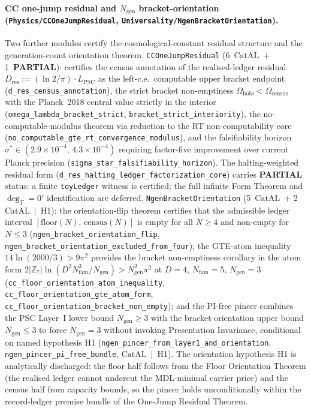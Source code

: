 \documentclass[11pt,a4paper]{article}
\theoremstyle{definition}
\newcommand{\CatAL}{\ensuremath{\mathrm{CatAL}}}
\begin{document}
\paragraph{CC one-jump residual and $N_{\mathrm{gen}}$ bracket-orientation
  (\texttt{Physics/\allowbreak CCOneJumpResidual},
   \texttt{Universality/\allowbreak NgenBracketOrientation}).}
Two further modules certify the cosmological-constant residual structure
and the generation-count orientation theorem.
\texttt{CCOneJumpResidual} (6~\CatAL\ + 1~\textbf{PARTIAL}):
certifies the census annotation of the realised-ledger residual
$D_{\mathrm{res}} := (\ln 2/\pi)\cdot L_{\mathrm{PSC}}$ as the left-c.e.\
computable upper bracket endpoint
(\texttt{d\_res\_census\_annotation}),
the strict bracket non-emptiness
$\Omega_{\mathrm{holo}} < \Omega_{\mathrm{census}}$ with the Planck~2018
central value strictly in the interior
(\texttt{omega\_lambda\_bracket\_strict},
 \texttt{bracket\_strict\_interiority}),
the no-computable-modulus theorem via reduction to the RT non-computability
core
(\texttt{no\_computable\_gte\_rt\_convergence\_modulus}),
and the falsifiability horizon
$\sigma^* \in (2.9{\times}10^{-4},\, 4.3{\times}10^{-4})$ requiring
factor-five improvement over current Planck precision
(\texttt{sigma\_star\_falsifiability\_horizon}).
The halting-weighted residual form
(\texttt{d\_res\_halting\_ledger\_factorization\_core})
carries \textbf{PARTIAL} status: a finite \texttt{toyLedger} witness is
certified; the full infinite Form Theorem and $\deg_T = 0'$
identification are deferred.
\texttt{NgenBracketOrientation} (5~\CatAL\ + 2~\CatAL~$|$~H1):
the orientation-flip theorem certifies that the admissible ledger interval
$[\mathrm{floor}(N),\, \mathrm{census}(N)]$ is empty for all $N \ge 4$
and non-empty for $N \le 3$
(\texttt{ngen\_bracket\_orientation\_flip},
 \texttt{ngen\_bracket\_orientation\_excluded\_from\_four});
the GTE-atom inequality $14\ln(2000/3) > 9\pi^2$ provides the bracket
non-emptiness corollary in the atom form
$2|\mathbb{Z}_7|\ln(D^2 N_{\mathrm{fam}}^3 / N_{\mathrm{gen}}) >
N_{\mathrm{gen}}^2\pi^2$ at $D{=}4$, $N_{\mathrm{fam}}{=}5$,
$N_{\mathrm{gen}}{=}3$
(\texttt{cc\_floor\_orientation\_atom\_inequality},
 \texttt{cc\_floor\_orientation\_gte\_atom\_form},
 \texttt{cc\_floor\_orientation\_bracket\_non\_empty});
and the PI-free pincer combines the PSC Layer~I lower bound
$N_{\mathrm{gen}} \ge 3$ with the bracket-orientation upper bound
$N_{\mathrm{gen}} \le 3$ to force $N_{\mathrm{gen}} = 3$ without invoking
Presentation Invariance, conditional on named hypothesis H1
(\texttt{ngen\_pincer\_from\_layer1\_and\_orientation},
 \texttt{ngen\_pincer\_pi\_free\_bundle},
 \CatAL~$|$~H1).
The orientation hypothesis H1 is analytically discharged: the floor half
follows from the Floor Orientation Theorem (the realised ledger cannot
undercut the MDL-minimal carrier price) and the census half from capacity
bounds, so the pincer holds unconditionally within the record-ledger
premise bundle of the One-Jump Residual Theorem.
\end{document}
